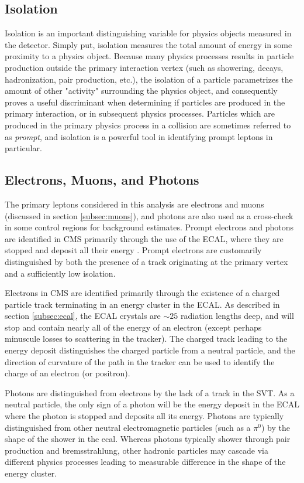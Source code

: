 \subsection{Isolation}
\label{subsec:iso}
Isolation is an important distinguishing variable for physics objects measured in the detector. Simply put, isolation measures the total amount of energy in some proximity to a physics object. Because many physics processes results in particle production outside the primary interaction vertex (such as showering, decays, hadronization, pair production, etc.), the isolation of a particle parametrizes the amount of other "activity" surrounding the physics object, and consequently proves a useful discriminant when determining if particles are produced in the primary interaction, or in subsequent physics processes. Particles which are produced in the primary physics process in a collision are sometimes referred to as {\it prompt}, and isolation is a powerful tool in identifying prompt leptons in particular.

\subsection{Electrons, Muons, and Photons}
\label{subsec:lepgamme}
The primary leptons considered in this analysis are electrons and muons (discussed in section \ref{subsec:muons}), and photons are also used as a cross-check in some control regions for background estimates. Prompt electrons and photons are identified in CMS primarily through the use of the ECAL, where they are stopped and deposit all their energy \cite{Baffioni:2006cd,Khachatryan:2015iwa}. Prompt electrons are customarily distinguished by both the presence of a track originating at the primary vertex and a sufficiently low isolation.

Electrons in CMS are identified primarily through the existence of a charged particle track terminating in an energy cluster in the ECAL. As described in section \ref{subsec:ecal}, the ECAL crystals are $\sim25$ radiation lengths deep, and will stop and contain nearly all of the energy of an electron (except perhaps minuscule losses to scattering in the tracker). The charged track leading to the energy deposit distinguishes the charged particle from a neutral particle, and the direction of curvature of the path in the tracker can be used to identify the charge of an electron (or positron).

Photons are distinguished from electrons by the lack of a track in the SVT. As a neutral particle, the only sign of a photon will be the energy deposit in the ECAL where the photon is stopped and deposits all its energy. Photons are typically distinguished from other neutral electromagnetic particles (such as a $\pi^0$) by the shape of the shower in the ecal. Whereas photons typically shower through pair production and bremsstrahlung, other hadronic particles may cascade via different physics processes leading to measurable difference in the shape of the energy cluster.


